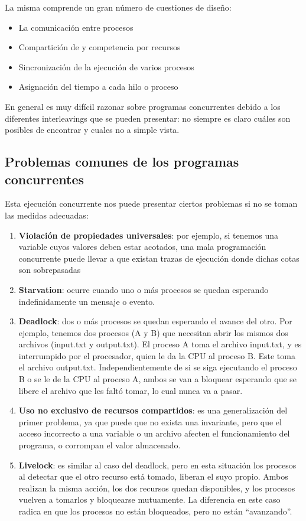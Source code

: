 La misma comprende un gran número de cuestiones de diseño:
\begin{itemize}
  \item La comunicación entre procesos
  \item Compartición de y competencia por recursos
  \item Sincronización de la ejecución de varios procesos
  \item Asignación del tiempo a cada hilo o proceso
\end{itemize}

En general es muy difícil razonar sobre programas concurrentes debido a los diferentes interleavings que se pueden presentar: no siempre es claro cuáles son posibles de encontrar y cuales no a simple vista.

\subsection{Problemas comunes de los programas concurrentes}
Esta ejecución concurrente nos puede presentar ciertos problemas si no se toman las medidas adecuadas:
\begin{enumerate}
  \item  \textbf{Violación de propiedades universales}: por ejemplo, si tenemos una variable cuyos valores deben estar acotados, una mala programación concurrente puede llevar a que existan trazas de ejecución donde dichas cotas son sobrepasadas
  \item  \textbf{Starvation}: ocurre cuando uno o más procesos se quedan esperando indefinidamente un mensaje o evento. 
  \item  \textbf{Deadlock}: dos o más procesos se quedan esperando el avance del otro. Por ejemplo, tenemos dos procesos (A y B) que necesitan abrir los mismos dos archivos (input.txt y output.txt). El proceso A toma el archivo input.txt, y es interrumpido por el procesador, quien le da la CPU al proceso B. Este toma el archivo output.txt. Independientemente de si se siga ejecutando el proceso B o se le de la CPU al proceso A, ambos se van a bloquear esperando que se libere el archivo que les faltó tomar, lo cual nunca va a pasar.
  \item  \textbf{Uso no exclusivo de recursos compartidos}: es una generalización del primer problema, ya que puede que no exista una invariante, pero que el acceso incorrecto a una variable o un archivo afecten el funcionamiento del programa, o corrompan el valor almacenado.
  \item  \textbf{Livelock}: es similar al caso del deadlock, pero en esta situación los procesos al detectar que el otro recurso está tomado, liberan el suyo propio. Ambos realizan la misma acción, los dos recursos quedan disponibles, y los procesos vuelven a tomarlos y bloquearse mutuamente. La diferencia en este caso radica en que los procesos no están bloqueados, pero no están ``avanzando''.
\end{enumerate}

